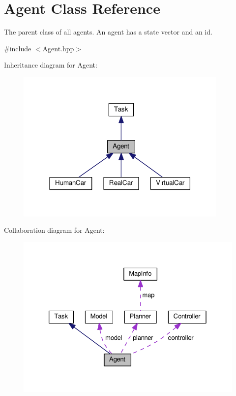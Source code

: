 \hypertarget{classAgent}{}\section{Agent Class Reference}
\label{classAgent}


The parent class of all agents. An agent has a state vector and an id.  




{\ttfamily \#include $<$Agent.\+hpp$>$}



Inheritance diagram for Agent\+:\nopagebreak
\begin{figure}[H]
\begin{center}
\leavevmode
\includegraphics[width=294pt]{classAgent__inherit__graph}
\end{center}
\end{figure}


Collaboration diagram for Agent\+:\nopagebreak
\begin{figure}[H]
\begin{center}
\leavevmode
\includegraphics[width=326pt]{classAgent__coll__graph}
\end{center}
\end{figure}
